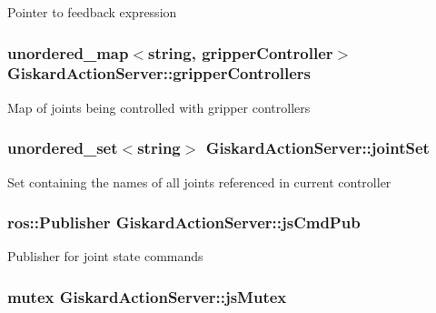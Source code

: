 Pointer to feedback expression \hypertarget{classGiskardActionServer_a20e66f4df22818fd6db1a78b4f9db129}{
\subsubsection[{gripper\-Controllers}]{\setlength{\rightskip}{0pt plus 5cm}unordered\-\_\-map$<$string, {\bf gripper\-Controller}$>$ Giskard\-Action\-Server\-::gripper\-Controllers\hspace{0.3cm}{\ttfamily [protected]}}}\label{classGiskardActionServer_a20e66f4df22818fd6db1a78b4f9db129}
Map of joints being controlled with gripper controllers \hypertarget{classGiskardActionServer_af4c11bee852dc54f821c4aabbeec5d7c}{
\subsubsection[{joint\-Set}]{\setlength{\rightskip}{0pt plus 5cm}unordered\-\_\-set$<$string$>$ Giskard\-Action\-Server\-::joint\-Set\hspace{0.3cm}{\ttfamily [protected]}}}\label{classGiskardActionServer_af4c11bee852dc54f821c4aabbeec5d7c}
Set containing the names of all joints referenced in current controller \hypertarget{classGiskardActionServer_a127b4e7740905cceb5a1ed2affd7fed3}{
\subsubsection[{js\-Cmd\-Pub}]{\setlength{\rightskip}{0pt plus 5cm}ros\-::\-Publisher Giskard\-Action\-Server\-::js\-Cmd\-Pub\hspace{0.3cm}{\ttfamily [private]}}}\label{classGiskardActionServer_a127b4e7740905cceb5a1ed2affd7fed3}
Publisher for joint state commands \hypertarget{classGiskardActionServer_ac77cdbd8c3b81397c4be868e6711a458}{
\subsubsection[{js\-Mutex}]{\setlength{\rightskip}{0pt plus 5cm}mutex Giskard\-Action\-Server\-::js\-Mutex\hspace{0.3cm}{\ttfamily [private]}}}\label{classGiskardActionServer_ac77cdbd8c3b81397c4be868e6711a458}
